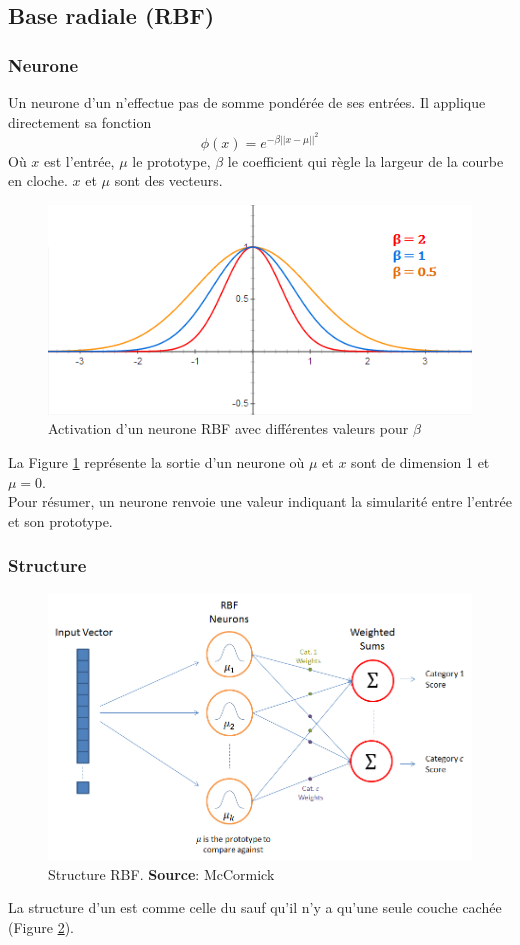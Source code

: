 \documentclass[12pt,a4paper,oneside, titlepage]{article}
\begin{document}
\subsection{Base radiale (RBF)}
\subsubsection*{Neurone}
Un neurone d'un \rbf n'effectue pas de somme pondérée de ses entrées. Il applique directement sa fonction \[\phi(x) = e^{-\beta||x-\mu||^2}\]
Où $x$ est l'entrée, $\mu$ le prototype, $\beta$ le coefficient qui règle la largeur de la courbe en cloche. $x$ et $\mu$ sont des vecteurs.
\begin{figure}
 \centering
 \includegraphics[scale=0.7]{../figures/RBFactivation.png}
 \caption{Activation d'un neurone RBF avec différentes valeurs pour $\beta$}
 \label{rbfactivation}
\end{figure}
La Figure \ref{rbfactivation} représente la sortie d'un neurone \rbf où $\mu$ et $x$ sont de dimension 1 et $\mu = 0$.\\
Pour résumer, un neurone \rbf renvoie une valeur indiquant la simularité entre l'entrée et son prototype.
\subsubsection*{Structure}
\begin{figure}
 \centering
 \includegraphics[scale=0.5]{../figures/RBFstruct.png}
 \caption{Structure RBF. \textbf{Source}: McCormick\cite{RBFtuto}}
 \label{structurerbf}
\end{figure}
La structure d'un \rbf est comme celle du \mlp sauf qu'il n'y a qu'une seule couche cachée (Figure \ref{structurerbf}).
\end{document}
